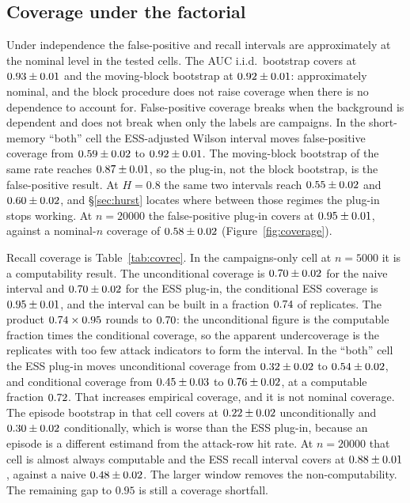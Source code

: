 \documentclass[a4paper,fleqn]{cas-dc}
\begin{document}
\subsection{Coverage under the factorial}\label{sec:coverage}
Under independence the false-positive and recall intervals are approximately at the nominal level
in the tested cells. The AUC
i.i.d.\ bootstrap covers at $0.93\pm0.01$ and the moving-block bootstrap at $0.92\pm0.01$:
approximately nominal, and the block procedure does not raise coverage when there is no dependence
to account for.
False-positive coverage breaks when the background is dependent and does not break when only the
labels are campaigns. In the short-memory ``both'' cell the ESS-adjusted Wilson interval moves
false-positive coverage from $0.59\pm0.02$ to $0.92\pm0.01$. The moving-block bootstrap of the same
rate reaches $0.87\pm0.01$, so the plug-in, not the block bootstrap, is the false-positive result.
At $H{=}0.8$ the same two intervals reach $0.55\pm0.02$ and $0.60\pm0.02$, and \S\ref{sec:hurst} locates
where between those regimes the plug-in stops working.
At $n{=}20000$ the false-positive plug-in covers at $0.95\pm0.01$, against a nominal-$n$ coverage of
$0.58\pm0.02$ (Figure~\ref{fig:coverage}).

Recall coverage is Table~\ref{tab:covrec}. In the campaigns-only cell at $n{=}5000$ it is a
computability result. The unconditional
coverage is $0.70\pm0.02$ for the naive interval and $0.70\pm0.02$ for the ESS plug-in,
the conditional ESS coverage is $0.95\pm0.01$, and the interval can be built in a fraction
$0.74$ of replicates. The product $0.74\times0.95$ rounds to
$0.70$: the unconditional figure is the computable fraction times the conditional
coverage, so the apparent undercoverage is the replicates with too few attack indicators to form
the interval. In the ``both'' cell the ESS plug-in moves unconditional coverage from
$0.32\pm0.02$ to $0.54\pm0.02$, and conditional coverage from $0.45\pm0.03$ to
$0.76\pm0.02$, at a computable fraction $0.72$. That increases empirical
coverage, and it is not nominal coverage. The episode bootstrap in that cell covers at
$0.22\pm0.02$ unconditionally and $0.30\pm0.02$ conditionally, which is worse than the ESS
plug-in, because an episode is a different estimand from the attack-row hit rate. At $n{=}20000$
that cell is almost always computable and the ESS recall interval covers at $0.88\pm0.01$,
against a naive $0.48\pm0.02$. The larger window removes the non-computability. The remaining
gap to $0.95$ is still a coverage shortfall.
\end{document}
